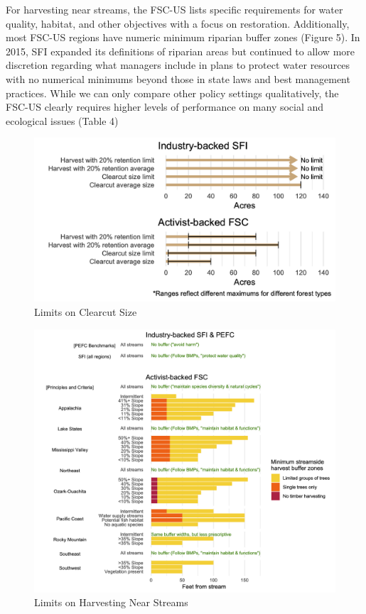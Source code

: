 \documentclass[
      12pt,
            Review ]{article}
\begin{document}
For harvesting near streams, the FSC-US lists specific requirements for
water quality, habitat, and other objectives with a focus on
restoration. Additionally, most FSC-US regions have numeric minimum
riparian buffer zones (Figure 5). In 2015, SFI expanded its definitions
of riparian areas but continued to allow more discretion regarding what
managers include in plans to protect water resources with no numerical
minimums beyond those in state laws and best management practices. While
we can only compare other policy settings qualitatively, the FSC-US
clearly requires higher levels of performance on many social and
ecological issues (Table 4)

\begin{figure}
\centering
\includegraphics{Figs/clearcuts-1.png}
\caption{Limits on Clearcut Size}
\end{figure}

\begin{figure}
\centering
\includegraphics{Figs/riparian-1.png}
\caption{Limits on Harvesting Near Streams}
\end{figure}
\end{document}
